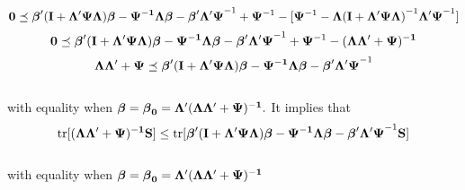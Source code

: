 \documentclass[11pt]{article}
\newcommand{\vecbeta}{\mbox{\boldmath$\beta$}}
\begin{document}
\\
$$\bold{0\preceq \vecbeta'(I+\Lambda'\Psi\Lambda)\vecbeta-\Psi^{-1}\Lambda\vecbeta-\vecbeta'\Lambda'\Psi}^{-1}+\bold{\Psi}^{-1}-[\bold{\Psi}^{-1}-\bold{\Lambda(I+\Lambda'\Psi\Lambda)}^{-1}\bold{\Lambda'\Psi}^{-1}]$$
$$\bold{0\preceq \vecbeta'(I+\Lambda'\Psi\Lambda)\vecbeta-\Psi^{-1}\Lambda\vecbeta-\vecbeta'\Lambda'\Psi}^{-1}+\bold{\Psi}^{-1}-\bold{(\Lambda\Lambda'+\Psi)^{-1}}$$
$$\bold{\Lambda\Lambda'+\Psi \preceq \vecbeta'(I+\Lambda'\Psi\Lambda)\vecbeta-\Psi^{-1}\Lambda\vecbeta-\vecbeta'\Lambda'\Psi}^{-1}$$
\\
with equality when $\bold{\vecbeta=\vecbeta_0=\Lambda'(\Lambda\Lambda'+\Psi)^{-1}}.$
It implies that \\
$$\text{tr}[\bold{(\Lambda\Lambda'+\Psi)^{-1}S]} \leq \text{tr}[\bold{\vecbeta'(I+\Lambda'\Psi\Lambda)\vecbeta-\Psi^{-1}\Lambda\vecbeta-\vecbeta'\Lambda'\Psi}^{-1}\bold{S}]$$ \\
with equality when $\bold{\vecbeta=\vecbeta_0=\Lambda'(\Lambda\Lambda'+\Psi)^{-1}}$
% 
%

 
\end{document}
